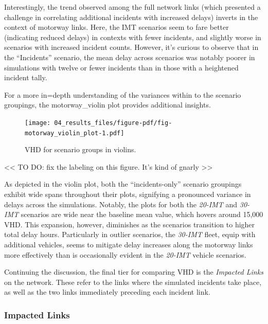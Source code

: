 \documentclass[
  letterpaper,
  authoryear]{elsarticle}
\begin{document}
Interestingly, the trend observed among the full network links (which
presented a challenge in correlating additional incidents with increased
delays) inverts in the context of motorway links. Here, the IMT
scenarios seem to fare better (indicating reduced delays) in contexts
with fewer incidents, and slightly worse in scenarios with increased
incident counts. However, it's curious to observe that in the
``Incidents'' scenario, the mean delay across scenarios was notably
poorer in simulations with twelve or fewer incidents than in those with
a heightened incident tally.

For a more in=depth understanding of the variances within to the
scenario groupings, the motorway\_violin plot provides additional
insights.

\begin{figure}

{\centering \texttt{[image: 04\_results\_files/figure-pdf/fig-motorway\_violin\_plot-1.pdf]}

}

\caption{\label{fig-motorway_violin_plot}VHD for scenario groups in
violins.}

\end{figure}

\textless\textless{} TO DO: fix the labeling on this figure. It's kind
of gnarly \textgreater\textgreater{}

As depicted in the violin plot, both the ``incidents-only'' scenario
groupings exhibit wide spans throughout their plots, signifying a
pronounced variance in delays across the simulations. Notably, the plots
for both the \emph{20-IMT} and \emph{30-IMT} scenarios are wide near the
baseline mean value, which hovers around 15,000 VHD. This expansion,
however, diminishes as the scenarios transition to higher total delay
hours. Particularly in outlier scenarios, the \emph{30-IMT} fleet, equip
with additional vehicles, seems to mitigate delay increases along the
motorway links more effectively than is occasionally evident in the
\emph{20-IMT} vehicle scenarios.

Continuing the discussion, the final tier for comparing VHD is the
\emph{Impacted Links} on the network. These refer to the links where the
simulated incidents take place, as well as the two links immediately
preceding each incident link.

\hypertarget{impacted-links}{%
\subsubsection{Impacted Links}\label{impacted-links}}
\end{document}
